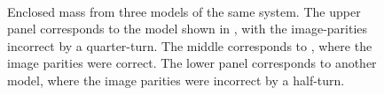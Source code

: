 \begin{figure}
  \centering
   \\
  \caption{Enclosed mass \kenc from three models of the same system.
    The upper panel corresponds to the model shown in ,
    with the image-parities incorrect by a quarter-turn.  The middle
    corresponds to , where the image parities were
    correct.  The lower panel corresponds to another model, where the
    image parities were incorrect by a half-turn.}
\label{fig:kapenc_compare_faulty}
\end{figure}

